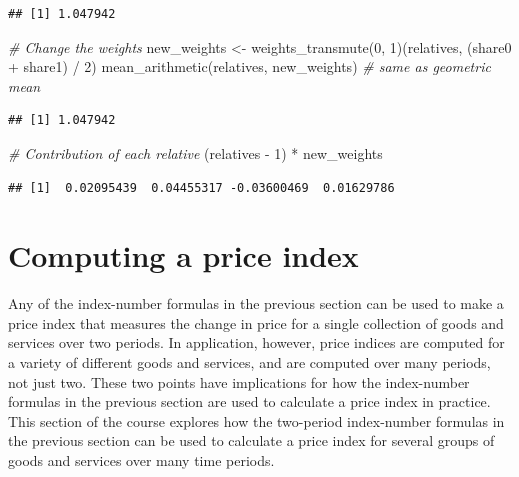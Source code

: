 \documentclass[
]{article}
\newenvironment{Shaded}{\begin{snugshade}}{\end{snugshade}}
\newcommand{\CommentTok}[1]{\textcolor[rgb]{0.56,0.35,0.01}{\textit{#1}}}
\newcommand{\DecValTok}[1]{\textcolor[rgb]{0.00,0.00,0.81}{#1}}
\newcommand{\FunctionTok}[1]{\textcolor[rgb]{0.00,0.00,0.00}{#1}}
\newcommand{\NormalTok}[1]{#1}
\newcommand{\OtherTok}[1]{\textcolor[rgb]{0.56,0.35,0.01}{#1}}
\newcommand{\SpecialCharTok}[1]{\textcolor[rgb]{0.00,0.00,0.00}{#1}}
\begin{document}
\begin{verbatim}
## [1] 1.047942
\end{verbatim}

\begin{Shaded}
\begin{Highlighting}[]
\CommentTok{\# Change the weights}
\NormalTok{new\_weights }\OtherTok{\textless{}{-}} \FunctionTok{weights\_transmute}\NormalTok{(}\DecValTok{0}\NormalTok{, }\DecValTok{1}\NormalTok{)(relatives, (share0 }\SpecialCharTok{+}\NormalTok{ share1) }\SpecialCharTok{/} \DecValTok{2}\NormalTok{)}
\FunctionTok{mean\_arithmetic}\NormalTok{(relatives, new\_weights) }\CommentTok{\# same as geometric mean}
\end{Highlighting}
\end{Shaded}

\begin{verbatim}
## [1] 1.047942
\end{verbatim}

\begin{Shaded}
\begin{Highlighting}[]
\CommentTok{\# Contribution of each relative}
\NormalTok{(relatives }\SpecialCharTok{{-}} \DecValTok{1}\NormalTok{) }\SpecialCharTok{*}\NormalTok{ new\_weights}
\end{Highlighting}
\end{Shaded}

\begin{verbatim}
## [1]  0.02095439  0.04455317 -0.03600469  0.01629786
\end{verbatim}

\hypertarget{computing-a-price-index}{%
\section{Computing a price index}\label{computing-a-price-index}}

Any of the index-number formulas in the previous section can be used to make a price index that measures the change in price for a single collection of goods and services over two periods. In application, however, price indices are computed for a variety of different goods and services, and are computed over many periods, not just two. These two points have implications for how the index-number formulas in the previous section are used to calculate a price index in practice. This section of the course explores how the two-period index-number formulas in the previous section can be used to calculate a price index for several groups of goods and services over many time periods.
\end{document}
